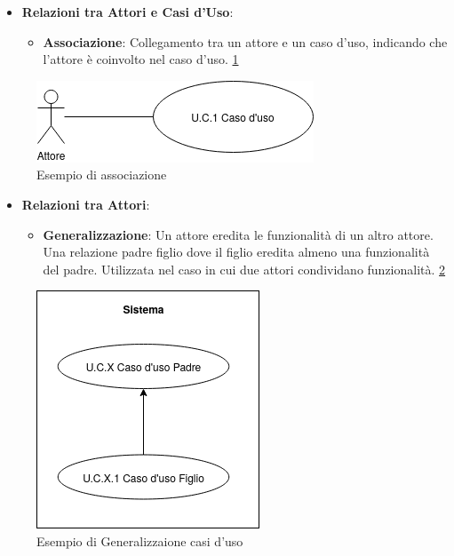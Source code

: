 \begin{itemize}
    \item \textbf{Relazioni tra Attori e Casi d’Uso}: 
    \begin{itemize}
        \item \textbf{Associazione}: Collegamento tra un attore e un caso d’uso, indicando che l’attore è coinvolto nel caso d’uso. \ref{fig:associazione}
    \end{itemize}
\end{itemize}

\begin{figure}[H]
    \centering
    \includegraphics{../../img/associazione.png}
    \caption{Esempio di associazione}
    \label{fig:associazione}
\end{figure}

\begin{itemize}
    \item \textbf{Relazioni tra Attori}:
    \begin{itemize}
        \item \textbf{Generalizzazione}: Un attore eredita le funzionalità di un altro attore. Una relazione padre figlio dove il figlio eredita almeno una funzionalità del padre. Utilizzata nel caso in cui due attori condividano funzionalità. \ref{fig:generalizzazione_casiuso}
    \end{itemize}
\end{itemize}

\begin{figure}[H]
    \centering
    \includegraphics{../../img/Generalizzazione_casiuso.png}
    \caption{Esempio di Generalizzaione casi d'uso}
    \label{fig:generalizzazione_casiuso}
\end{figure}

